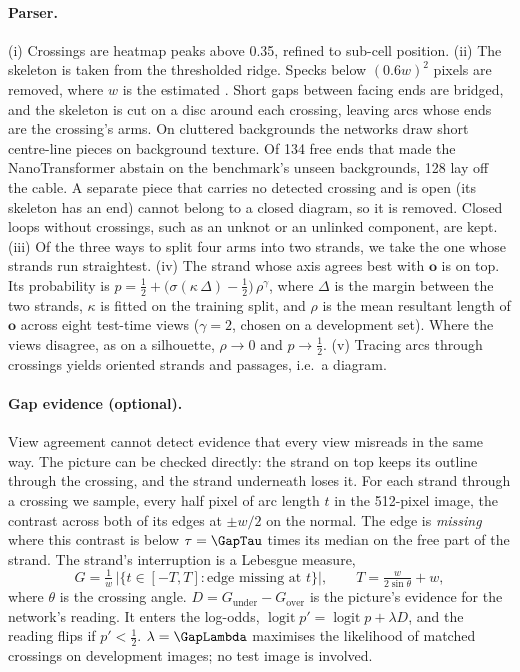 \paragraph{Parser.} (i) Crossings are heatmap peaks above 0.35, refined to sub-cell
position. (ii) The skeleton is taken from the thresholded ridge. Specks below
$(0.6w)^2$ pixels are removed, where $w$ is the estimated \cw. Short gaps between
facing ends are bridged, and the skeleton is cut on a disc around each crossing,
leaving arcs whose ends are the crossing's arms. On cluttered backgrounds the networks draw short
centre-line pieces on background texture. Of 134 free ends that made the NanoTransformer abstain on
the benchmark's unseen backgrounds, 128 lay off the cable. A separate piece that carries no
detected crossing and is open (its skeleton has an end) cannot belong to a closed diagram, so it is
removed. Closed loops without crossings, such as an unknot or an unlinked component, are kept.
(iii) Of the three ways to split
four arms into two strands, we take the one whose strands run straightest. (iv) The
strand whose axis agrees best with $\mathbf{o}$ is on top. Its probability is
$p=\tfrac12+\big(\sigma(\kappa\,\Delta)-\tfrac12\big)\,\rho^{\gamma}$, where $\Delta$ is the
margin between the two strands, $\kappa$ is fitted on the training split, and $\rho$
is the mean resultant length of $\mathbf{o}$ across eight test-time views
($\gamma=2$, chosen on a development set). Where the views disagree, as on a
silhouette, $\rho\to0$ and $p\to\tfrac12$. (v) Tracing arcs through crossings yields
oriented strands and passages, i.e.\ a diagram.

\paragraph{Gap evidence (optional).} View agreement cannot detect \ou{} evidence that every
view misreads in the same way. The picture can be checked directly: the strand on top keeps
its outline through the crossing, and the strand underneath loses it. For each strand through a
crossing we sample, every half pixel of arc length $t$ in the 512-pixel image, the contrast
across both of its edges at $\pm w/2$ on the normal. The edge is \emph{missing} where this
contrast is below $\tau=\GapTau$ times its median on the free part of the strand. The strand's
interruption is a Lebesgue measure,
\[ G=\tfrac1w\,\big|\{t\in[-T,T]:\text{edge missing at }t\}\big|,\qquad T=\tfrac{w}{2\sin\theta}+w,\]
where $\theta$ is the crossing angle. $D=G_{\text{under}}-G_{\text{over}}$ is the picture's
evidence for the network's reading. It enters the log-odds,
$\operatorname{logit}p'=\operatorname{logit}p+\lambda D$, and the reading flips if
$p'<\tfrac12$. $\lambda=\GapLambda$ maximises the likelihood of \GapDevCross{} matched
crossings on development images; no test image is involved.


